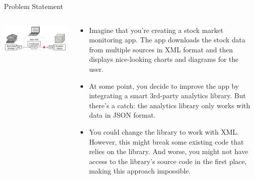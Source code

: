 \documentclass[13pt]{beamer}
\begin{document}
\begin{frame}{Problem Statement}
	\begin{columns}[T]
		\begin{column}{.5\textwidth}
			\includegraphics[scale=0.3]{./images/problem.png}
		\end{column}
	
		\begin{column}{.5\textwidth}
			\begin{itemize}
				\item Imagine that you’re creating a stock market monitoring app. The app downloads the stock data from multiple sources in XML format and then displays nice-looking charts and diagrams for the user.
				\item At some point, you decide to improve the app by integrating a smart 3rd-party analytics library. But there’s a catch: the analytics library only works with data in JSON format.
				\item You could change the library to work with XML. However, this might break some existing code that relies on the library. And worse, you might not have access to the library’s source code in the first place, making this approach impossible.
			\end{itemize}
		\end{column}
	\end{columns}
\end{frame}
\end{document}
